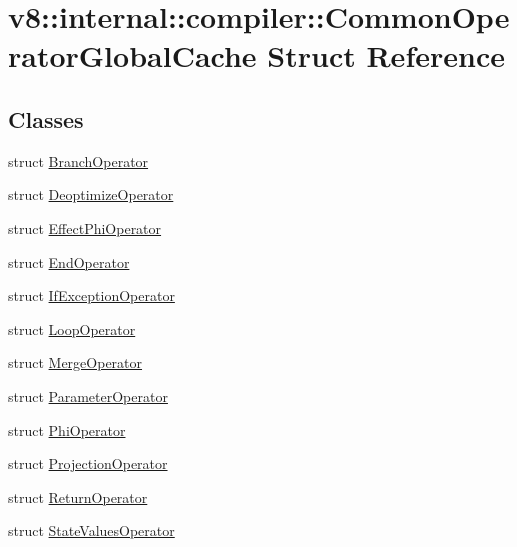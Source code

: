 \hypertarget{structv8_1_1internal_1_1compiler_1_1_common_operator_global_cache}{}\section{v8\+:\+:internal\+:\+:compiler\+:\+:Common\+Operator\+Global\+Cache Struct Reference}
\label{structv8_1_1internal_1_1compiler_1_1_common_operator_global_cache}
\subsection*{Classes}
\begin{DoxyCompactItemize}
\item 
struct \hyperlink{structv8_1_1internal_1_1compiler_1_1_common_operator_global_cache_1_1_branch_operator}{Branch\+Operator}
\item 
struct \hyperlink{structv8_1_1internal_1_1compiler_1_1_common_operator_global_cache_1_1_deoptimize_operator}{Deoptimize\+Operator}
\item 
struct \hyperlink{structv8_1_1internal_1_1compiler_1_1_common_operator_global_cache_1_1_effect_phi_operator}{Effect\+Phi\+Operator}
\item 
struct \hyperlink{structv8_1_1internal_1_1compiler_1_1_common_operator_global_cache_1_1_end_operator}{End\+Operator}
\item 
struct \hyperlink{structv8_1_1internal_1_1compiler_1_1_common_operator_global_cache_1_1_if_exception_operator}{If\+Exception\+Operator}
\item 
struct \hyperlink{structv8_1_1internal_1_1compiler_1_1_common_operator_global_cache_1_1_loop_operator}{Loop\+Operator}
\item 
struct \hyperlink{structv8_1_1internal_1_1compiler_1_1_common_operator_global_cache_1_1_merge_operator}{Merge\+Operator}
\item 
struct \hyperlink{structv8_1_1internal_1_1compiler_1_1_common_operator_global_cache_1_1_parameter_operator}{Parameter\+Operator}
\item 
struct \hyperlink{structv8_1_1internal_1_1compiler_1_1_common_operator_global_cache_1_1_phi_operator}{Phi\+Operator}
\item 
struct \hyperlink{structv8_1_1internal_1_1compiler_1_1_common_operator_global_cache_1_1_projection_operator}{Projection\+Operator}
\item 
struct \hyperlink{structv8_1_1internal_1_1compiler_1_1_common_operator_global_cache_1_1_return_operator}{Return\+Operator}
\item 
struct \hyperlink{structv8_1_1internal_1_1compiler_1_1_common_operator_global_cache_1_1_state_values_operator}{State\+Values\+Operator}
\end{DoxyCompactItemize}
